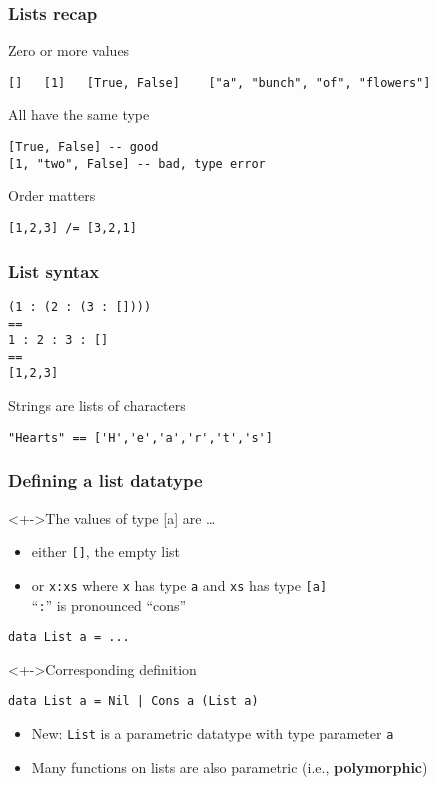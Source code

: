\documentclass{beamer}
\subtitle{More about lists}
\begin{document}
\begin{frame}
  \titlepage
\end{frame}
\begin{frame}[fragile]
  \frametitle{Lists recap}
  \begin{block}{Zero or more values}
\begin{verbatim}
[]   [1]   [True, False]    ["a", "bunch", "of", "flowers"]
\end{verbatim}
  \end{block}
  \begin{block}{All have the same type}
\begin{verbatim}
[True, False] -- good
[1, "two", False] -- bad, type error
\end{verbatim}
  \end{block}
  \begin{block}{Order matters}
\begin{verbatim}
[1,2,3] /= [3,2,1]
\end{verbatim}
  \end{block}
\end{frame}
\begin{frame}[fragile]
  \frametitle{List syntax}
\begin{verbatim}
(1 : (2 : (3 : []))) 
==
1 : 2 : 3 : [] 
==
[1,2,3]
\end{verbatim}
  Strings are lists of characters
\begin{verbatim}
"Hearts" == ['H','e','a','r','t','s']
\end{verbatim}
\end{frame}
\begin{frame}[fragile]
  \frametitle{Defining a list datatype}
    \begin{block}<+->{The values of type [a] are \dots}
    \begin{itemize}
    \item either \texttt{[]}, the empty list
    \item or \texttt{x:xs} where \texttt{x} has type \texttt{a} and
      \texttt{xs} has type \texttt{[a]} \\
      ``\texttt{:}'' is pronounced ``cons''
    \end{itemize}
  \end{block}
\begin{verbatim}
data List a = ...
\end{verbatim}
  \begin{block}<+->{Corresponding definition}
\begin{verbatim}
data List a = Nil | Cons a (List a)
\end{verbatim}
    \begin{itemize}
    \item New: \texttt{List} is a parametric datatype with type
      parameter \texttt{a}
    \item Many functions on lists are also parametric (i.e., \textbf{polymorphic}) 
  \end{itemize}
  \end{block}  
\end{frame}
\end{document}
